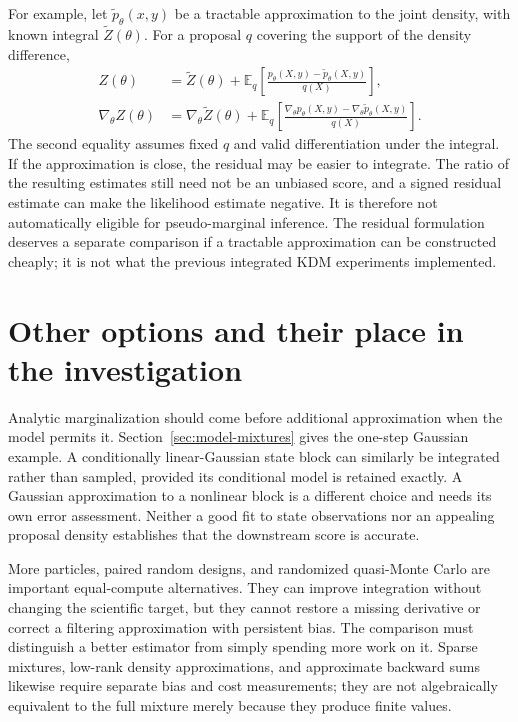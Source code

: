 \documentclass[11pt]{article}
\begin{document}
For example, let $\widetilde p_\theta(x,y)$ be a tractable approximation to
the joint density, with known integral $\widetilde Z(\theta)$. For a proposal
$q$ covering the support of the density difference,
\begin{align}
 Z(\theta)&=\widetilde Z(\theta)
 +\mathbb E_q\!\left[
       \frac{p_\theta(X,y)-\widetilde p_\theta(X,y)}{q(X)}\right],\\
 \nabla_\theta Z(\theta)&=\nabla_\theta\widetilde Z(\theta)
 +\mathbb E_q\!\left[
       \frac{\nabla_\theta p_\theta(X,y)
             -\nabla_\theta\widetilde p_\theta(X,y)}{q(X)}\right].
 \label{eq:joint-surrogate-residual}
\end{align}
The second equality assumes fixed $q$ and valid differentiation under the
integral. If the approximation is close, the residual may be easier to
integrate. The ratio of the resulting estimates still need not be an unbiased
score, and a signed residual estimate can make the likelihood estimate
negative. It is therefore not automatically eligible for pseudo-marginal
inference. The residual formulation deserves a separate comparison if a
tractable approximation can be constructed cheaply; it is not what the
previous integrated KDM experiments implemented.


\section{Other options and their place in the investigation}
\label{sec:alternatives}

Analytic marginalization should come before additional approximation when
the model permits it. Section~\ref{sec:model-mixtures} gives the one-step
Gaussian example. A conditionally linear-Gaussian state block can similarly
be integrated rather than sampled, provided its conditional model is retained
exactly. A Gaussian approximation to a nonlinear block is a different choice
and needs its own error assessment. Neither a good fit to state observations
nor an appealing proposal density establishes that the downstream score is
accurate.

More particles, paired random designs, and randomized quasi-Monte Carlo are
important equal-compute alternatives. They can improve integration without
changing the scientific target, but they cannot restore a missing derivative
or correct a filtering approximation with persistent bias. The comparison
must distinguish a better estimator from simply spending more work on it.
Sparse mixtures, low-rank density approximations, and approximate backward
sums likewise require separate bias and cost measurements; they are not
algebraically equivalent to the full mixture merely because they produce
finite values.
\end{document}
